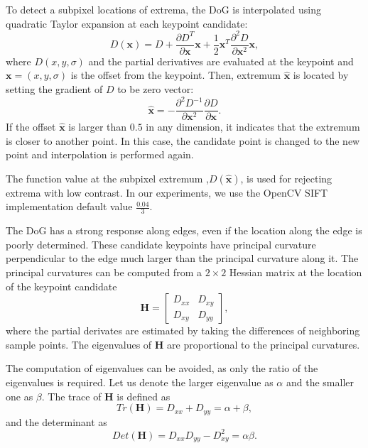 To detect a subpixel locations of extrema, the DoG is interpolated using quadratic Taylor expansion at each keypoint candidate:
\begin{equation}
    D(\boldsymbol{x}) = D + \frac{\partial D^T}{\partial \boldsymbol{x}}\boldsymbol{x}+\frac{1}{2}\boldsymbol{x}^T\frac{\partial^2 D}{\partial \boldsymbol{x}^2}\boldsymbol{x},
    \label{eq:taylor_expansion}
\end{equation}
where \( D(x,y,\sigma) \) and the partial derivatives are evaluated at the keypoint and \( \boldsymbol{x}=(x,y,\sigma) \) is the offset from the keypoint. Then, extremum \( \hat{\boldsymbol{x}} \) is located by setting the gradient of \( D \) to be zero vector:
\begin{equation}
    \hat{\boldsymbol{x}} = - \frac{\partial^2 D^{-1}}{\partial \boldsymbol{x}^2}\frac{\partial D}{\partial \boldsymbol{x}}.
    \label{eq:taylor_extremum}
\end{equation}
If the offset \( \hat{\boldsymbol{x}} \) is larger than \( 0.5 \) in any dimension, it indicates that the extremum is closer to another point. In this case, the candidate point is changed to the new point and interpolation is performed again.

The function value at the subpixel extremum ,$D(\hat{\boldsymbol{x}})$, is used for rejecting extrema with low contrast. In our experiments, we use the OpenCV SIFT implementation default value $\frac{0.04}{3}$\cite{openCV}.

The DoG has a strong response along edges, even if the location along the edge is poorly determined. These candidate keypoints have principal curvature perpendicular to the edge much larger than the principal curvature along it. The principal curvatures can be computed from a $2\times2$ Hessian matrix at the location of the keypoint candidate
\begin{equation}
    \boldsymbol{H} =
    \begin{bmatrix}
        D_{xx} & D_{xy}\\
        D_{xy} & D_{yy}
    \end{bmatrix},
    \label{eq:hessian}
\end{equation}
where the partial derivates are estimated by taking the differences of neighboring sample points. The eigenvalues of $\boldsymbol{H}$ are proportional to the principal curvatures.

The computation of eigenvalues can be avoided, as only the ratio of the eigenvalues is required. Let us denote the larger eigenvalue as $\alpha$ and the smaller one as $\beta$. The trace of $\boldsymbol{H}$ is defined as
\begin{equation}
    Tr(\boldsymbol{H}) = D_{xx}+D_{yy} = \alpha+\beta,
\end{equation}
and the determinant as
\begin{equation}
    Det(\boldsymbol{H}) = D_{xx}D_{yy}-D_{xy}^2 = \alpha\beta.
\end{equation}

